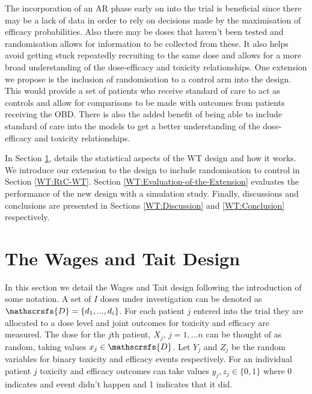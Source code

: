 The incorporation of an AR phase early on into the trial is beneficial since there may be a lack of data in order to rely on decisions made by the maximisation of efficacy probabilities. Also there may be doses that haven't been tested and randomisation allows for information to be collected from these. It also helps avoid getting stuck repeatedly recruiting to the same dose and allows for a more broad understanding of the dose-efficacy and toxicity relationships. One extension we propose is the inclusion of randomisation to a control arm into the design. This would provide a set of patients who receive standard of care to act as controls and allow for comparisons to be made with outcomes from patients receiving the OBD. There is also the added benefit of being able to include standard of care into the models to get a better understanding of the dose-efficacy and toxicity relationships.  

In Section \ref{WT:Wages-and-Tait-Design}, details the statistical aspects of the WT design and how it works. We introduce our extension to the design to include randomisation to control in Section \ref{WT:RtC-WT}. Section \ref{WT:Evaluation-of-the-Extension} evaluates the performance of the new design with a simulation study. Finally, discussions and conclusions are presented in Sections \ref{WT:Discussion} and \ref{WT:Conclusion} respectively.  


\section{The Wages and Tait Design}
\label{WT:Wages-and-Tait-Design}

In this section we detail the Wages and Tait design following the introduction of some notation. A set of $I$ doses under investigation can be denoted as $\mathscrsfs{D} = \{d_1, ...,d_i\}$. For each patient $j$ entered into the trial they are allocated to a dose level and joint outcomes for toxicity and efficacy are measured. The dose for the $j$th patient, $X_j$, $j = 1,...n$ can be thought of as random, taking values $x_j \in  \mathscrsfs{D}$. Let $Y_j$ and $Z_j$ be the random variables for binary toxicity and efficacy events respectively. For an individual patient $j$ toxicity and efficacy outcomes can take values $y_j, z_j \in \{0,1\}$ where 0 indicates and event didn't happen and 1 indicates that it did. 

